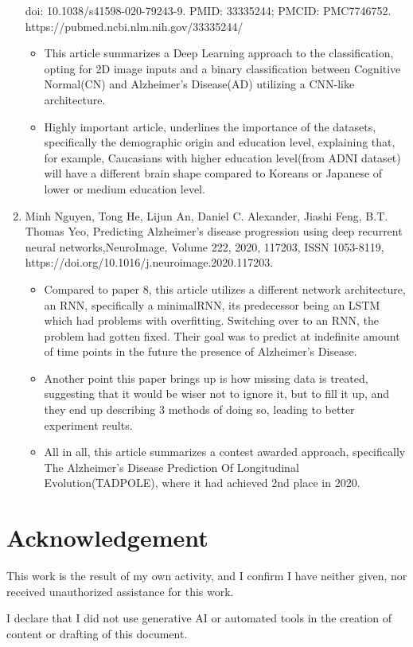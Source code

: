 \documentclass[a4paper]{article}
\begin{document}
\begin{enumerate}
            doi: 10.1038/s41598-020-79243-9. PMID: 33335244; PMCID: PMC7746752. \\
            https://pubmed.ncbi.nlm.nih.gov/33335244/
            \begin{itemize}
                  \item This article summarizes a Deep Learning approach to the classification, opting for 2D image inputs and a binary classification
                        between Cognitive Normal(CN) and Alzheimer's Disease(AD) utilizing a CNN-like architecture.
                  \item Highly important article, underlines the importance of the datasets, specifically the demographic origin and education level,
                        explaining that, for example, Caucasians with higher education level(from ADNI dataset) will have a different brain shape
                        compared to Koreans or Japanese of lower or medium education level.
            \end{itemize}
      \item Minh Nguyen, Tong He, Lijun An, Daniel C. Alexander, Jiashi Feng, B.T. Thomas Yeo, Predicting Alzheimer's disease progression using deep
            recurrent neural networks,NeuroImage, Volume 222, 2020, 117203, ISSN 1053-8119, https://doi.org/10.1016/j.neuroimage.2020.117203.
            \begin{itemize}
                  \item Compared to paper 8, this article utilizes a different network architecture, an RNN, specifically a minimalRNN,
                        its predecessor being an LSTM which had problems with overfitting. Switching over to an RNN, the problem had gotten fixed.
                        Their goal was to predict at indefinite amount of time points in the future the presence of Alzheimer's Disease.
                  \item Another point this paper brings up is how missing data is treated, suggesting that it would be wiser not to ignore it, but
                        to fill it up, and they end up describing 3 methods of doing so, leading to better experiment reults.
                  \item All in all, this article summarizes a contest awarded approach, specifically The Alzheimer's Disease Prediction
                        Of Longitudinal Evolution(TADPOLE), where it had achieved 2nd place in 2020.
            \end{itemize}
\end{enumerate}

\section*{Acknowledgement}

This work is the result of my own activity, and I confirm I have neither given, nor received unauthorized assistance for this work.

I declare that I did not use generative AI or automated tools in the creation of content or drafting of this document.
\end{document}
